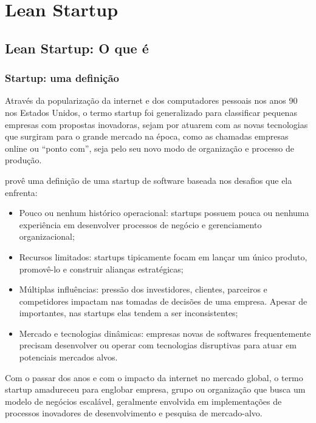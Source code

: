 \chapter{Lean Startup}
\label{cap:leanstartup}
\section{Lean Startup: O que é}
\subsection{Startup: uma definição}
\par Através da popularização da internet e dos computadores pessoais nos anos 90 nos Estados Unidos, o termo startup foi generalizado para classificar pequenas empresas com propostas inovadoras, sejam por atuarem com as novas tecnologias que surgiram para o grande mercado na época, como as chamadas empresas online ou ``ponto com'', seja pelo seu novo modo de organização e processo de produção.
\par \cite{nicolo:14} provê uma definição de uma startup de software baseada nos desafios que ela enfrenta:
\begin{itemize}
\item Pouco ou nenhum histórico operacional: startups possuem pouca ou nenhuma experiência em desenvolver processos de negócio e gerenciamento organizacional;
\item Recursos limitados: startups tipicamente focam em lançar um único produto, promovê-lo e construir alianças estratégicas;
\item Múltiplas influências: pressão dos investidores, clientes, parceiros e competidores impactam nas tomadas de decisões de uma empresa. Apesar de importantes, nas startups elas tendem a ser inconsistentes;
\item Mercado e tecnologias dinâmicas: empresas novas de softwares frequentemente precisam desenvolver ou operar com tecnologias disruptivas para atuar em potenciais mercados alvos.
\end{itemize}

\par Com o passar dos anos e com o impacto da internet no mercado global, o termo startup amadureceu para englobar empresa, grupo ou organização que busca um modelo de negócios escalável, geralmente envolvida em implementações de processos inovadores de desenvolvimento e pesquisa de mercado-alvo. \citep{blank:03}


